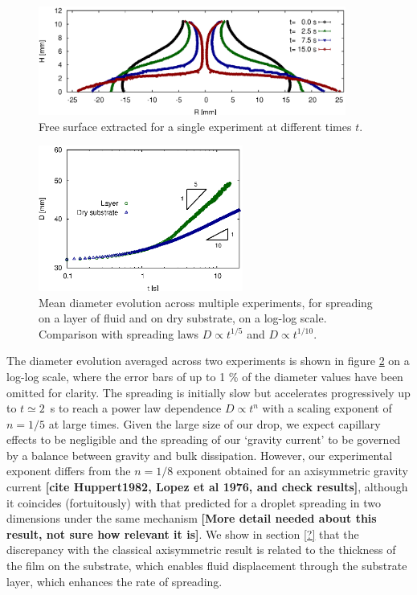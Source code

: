 \documentclass[aip,graphicx]{revtex4-1}
\begin{document}
\begin{figure}[!ht]
\centering
\includegraphics[width=0.9\textwidth]{figures/glucose_thick_layer_8_fs_dim.eps}
\caption{Free surface extracted for a single experiment at different times $t$.}
\label{fig:glucose_thick_layer_8_fs_dim}
\end{figure}


\begin{figure}[!ht]
\centering
\includegraphics[width=0.6\textwidth]{figures/diam_vs_time_comp_layer_dry.eps}
\caption{Mean diameter evolution across multiple experiments, for spreading on a layer of fluid and on dry substrate, on a log-log scale. Comparison with spreading laws $D \propto t^{1/5}$ and $D \propto t^{1/10}$.}
\label{fig:diam_vs_time_comp_layer_dry}
\end{figure}

The diameter evolution averaged across two experiments is shown in figure \ref{fig:diam_vs_time_comp_layer_dry} on a log-log scale, where the error bars of up to 1 \% of the diameter values have been omitted for clarity. The spreading is initially slow but accelerates progressively up to $t\simeq 2$~s to reach a power law dependence $D \propto t^n$ with a scaling exponent of $n=1/5$ at large times. Given the large size of our drop, we expect capillary effects to be negligible and the spreading of our `gravity current' to be governed by a balance between gravity and bulk dissipation. However, our experimental exponent differs from the $n=1/8$ exponent  obtained for an axisymmetric gravity current {\bf [cite Huppert1982, Lopez et al 1976, and check results]}, although it coincides (fortuitously) with that predicted for a droplet spreading in two dimensions under the same mechanism \cite{bonn2009wetting} {\bf [More detail needed about this result, not sure how relevant it is]}. We show in section \ref{?} that the discrepancy with the classical axisymmetric result is related to the thickness of the film on the substrate, which enables fluid displacement through the substrate layer, which enhances the rate of spreading. 
\end{document}
